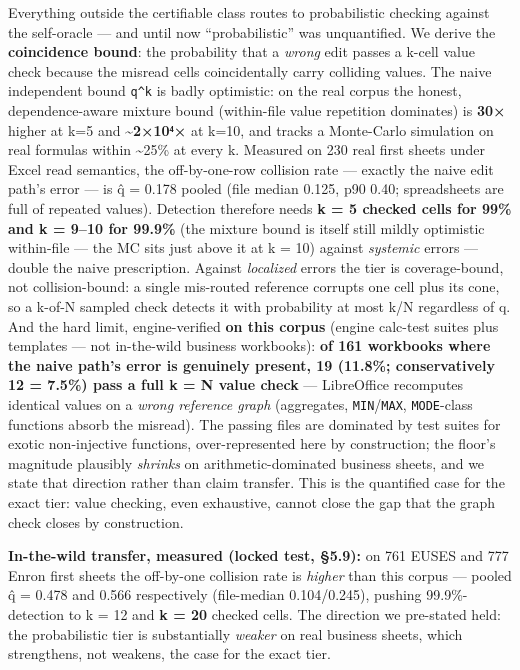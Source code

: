 \documentclass[
  11pt,
]{article}
\begin{document}
Everything outside the certifiable class routes to probabilistic
checking against the self-oracle --- and until now ``probabilistic'' was
unquantified. We derive the \textbf{coincidence bound}: the probability
that a \emph{wrong} edit passes a k-cell value check because the misread
cells coincidentally carry colliding values. The naive independent bound
\texttt{q\^{}k} is badly optimistic: on the real corpus the honest,
dependence-aware mixture bound (within-file value repetition dominates)
is \textbf{30×} higher at k=5 and \textbf{\textasciitilde2×10⁴×} at
k=10, and tracks a Monte-Carlo simulation on real formulas within
\textasciitilde25\% at every k. Measured on 230 real first sheets under
Excel read semantics, the off-by-one-row collision rate --- exactly the
naive edit path's error --- is q̂ = 0.178 pooled (file median 0.125, p90
0.40; spreadsheets are full of repeated values). Detection therefore
needs \textbf{k = 5 checked cells for 99\% and k = 9--10 for 99.9\%}
(the mixture bound is itself still mildly optimistic within-file --- the
MC sits just above it at k = 10) against \emph{systemic} errors ---
double the naive prescription. Against \emph{localized} errors the tier
is coverage-bound, not collision-bound: a single mis-routed reference
corrupts one cell plus its cone, so a k-of-N sampled check detects it
with probability at most k/N regardless of q. And the hard limit,
engine-verified \textbf{on this corpus} (engine calc-test suites plus
templates --- not in-the-wild business workbooks): \textbf{of 161
workbooks where the naive path's error is genuinely present, 19 (11.8\%;
conservatively 12 = 7.5\%) pass a full k = N value check} ---
LibreOffice recomputes identical values on a \emph{wrong reference
graph} (aggregates, \texttt{MIN}/\texttt{MAX}, \texttt{MODE}-class
functions absorb the misread). The passing files are dominated by test
suites for exotic non-injective functions, over-represented here by
construction; the floor's magnitude plausibly \emph{shrinks} on
arithmetic-dominated business sheets, and we state that direction rather
than claim transfer. This is the quantified case for the exact tier:
value checking, even exhaustive, cannot close the gap that the graph
check closes by construction.

\textbf{In-the-wild transfer, measured (locked test, §5.9):} on 761
EUSES and 777 Enron first sheets the off-by-one collision rate is
\emph{higher} than this corpus --- pooled q̂ = 0.478 and 0.566
respectively (file-median 0.104/0.245), pushing 99.9\%-detection to k =
12 and \textbf{k = 20} checked cells. The direction we pre-stated held:
the probabilistic tier is substantially \emph{weaker} on real business
sheets, which strengthens, not weakens, the case for the exact tier.
\end{document}
